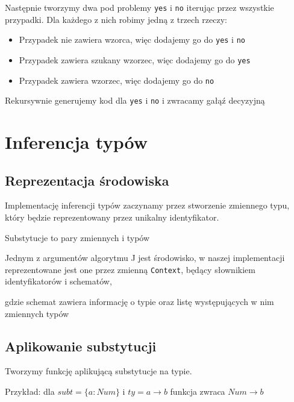\documentclass[a4paper,12pt]{book} %
\begin{document}
Następnie tworzymy dwa pod problemy \lstinline{yes} i \lstinline{no} iterując przez wszystkie przypadki. Dla każdego z nich robimy jedną z trzech rzeczy:
\begin{itemize}
  \item Przypadek nie zawiera wzorca, więc dodajemy go do \lstinline{yes} i \lstinline{no}
        \newpage
  \item Przypadek zawiera szukany wzorzec, więc dodajemy go do \lstinline{yes}
        
  \item Przypadek zawiera wzorzec, więc dodajemy go do \lstinline{no}
        
\end{itemize}

Rekursywnie generujemy kod dla \lstinline{yes} i \lstinline{no} i zwracamy gałąź decyzyjną
\newpage
\section{Inferencja typów}
\subsection{Reprezentacja środowiska}
Implementację inferencji typów zaczynamy przez stworzenie zmiennego typu, który będzie reprezentowany przez unikalny identyfikator.

Substytucje to pary zmiennych i typów

Jednym z argumentów algorytmu J jest środowisko, w naszej implementacji reprezentowane jest one przez zmienną \lstinline$Context$, będący słownikiem identyfikatorów i schematów,

gdzie schemat zawiera informację o typie oraz listę występujących w nim zmiennych typów


\newpage
\subsection{Aplikowanie substytucji}
Tworzymy funkcję aplikującą substytucje na typie.

Przykład: dla $subt=\{a:Num\}$ i $ty=a\rightarrow b$ funkcja zwraca $Num\rightarrow b$

\end{document}
